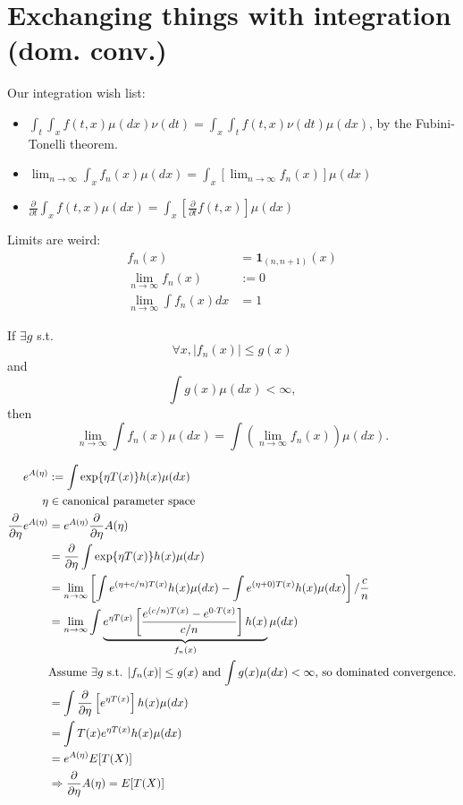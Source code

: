 \documentclass[twoside]{article}
\begin{document}
\section{Exchanging things with integration (dom. conv.)}

Our integration wish list:
\begin{itemize}
  \item $\int_t \int_x f(t, x) \mu(dx) \nu(dt) = \int_x \int_t f(t, x) \nu(dt)
    \mu(dx)$, by the Fubini-Tonelli theorem.
  \item $\lim_{n \rightarrow \infty} \int_x f_n(x) \mu(dx) = \int_x \left[
    \lim_{n \rightarrow \infty} f_n(x) \right] \mu(dx)$
  \item $\frac{\partial}{\partial t} \int_x f(t, x) \mu(dx) = \int_x
    \left[\frac{\partial}{\partial t} f(t, x)\right] \mu(dx)$
\end{itemize}

Limits are weird:
\begin{align*}
  f_n(x) &= \mathbf{1}_{(n, n+1)}(x) \\
  \lim_{n \rightarrow \infty} f_n(x) &:= 0 \\
  \lim_{n \rightarrow \infty} \int f_n(x) dx &= 1
\end{align*}

\begin{theorem}\citep[Lemma 2.5, p.~51]{keener}
  If $\exists g$ s.t. \[\forall x, |f_n(x)| \le g(x)\] and \[\int g(x) \mu(dx) <
  \infty,\] then \[\lim_{n \rightarrow \infty} \int f_n(x) \mu(dx) = \int
  \left(\lim_{n \rightarrow \infty} f_n(x) \right) \mu(dx).\]
\end{theorem}

\begin{example}
\begin{align*}
  e^{A(\eta)} &:= \int \exp\{\eta T(x) \} h(x) \mu(dx) \\
  \eta &\in \text{canonical parameter space} \\
  \frac{\partial}{\partial \eta} e^{A(\eta)} &= e^{A(\eta)}
  \frac{\partial}{\partial \eta}A(\eta) \\
  &= \frac{\partial}{\partial \eta} \int \exp\{\eta T(x) \} h(x) \mu(dx)\\
  &= \lim_{n \rightarrow \infty} \left[ \int e^{(\eta + c/n)T(x)} h(x) \mu(dx) -
  \int e^{(\eta + 0)T(x)} h(x) \mu(dx) \right]/ \frac{c}{n} \\
  &= \lim_{n \rightarrow \infty} \int \underbrace{e^{\eta T(x)} \left[
  \frac{e^{(c/n)T(x)} - e^{0 \cdot T(x)}}{c/n} \right] h(x)}_{f_n(x)} \mu(dx) \\
  & \text{Assume $\exists g$ s.t. $|f_n(x)| \le g(x)$ and $\int g(x) \mu(dx) <
  \infty$, so dominated convergence.} \\
  &= \int \frac{\partial}{\partial \eta} \left[e^{\eta T(x)}\right] h(x) \mu(dx) \\
  &= \int T(x) e^{\eta T(x)} h(x) \mu(dx)  \\
  &= e^{A(\eta)} E[T(X)] \\
  &\Rightarrow \frac{\partial}{\partial \eta} A(\eta) = E[T(X)]
\end{align*}
\end{example}




\end{document}
